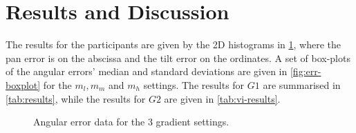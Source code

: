 \documentclass{llncs}
\begin{document}
\section{Results and Discussion}\label{sec:results}

The results for the participants are given by the 2D histograms in \cref{fig:err-results}, where the pan error is on the abscissa and the tilt error on the ordinates.
A set of box-plots of the angular errors' median and standard deviations are given in \cref{fig:err-boxplot} for the $m_l, m_m$ and $m_h$ settings. 
The results for $G1$ are summarised in \cref{tab:results}, while the results for $G2$ are given in \cref{tab:vi-results}.

\begin{figure}
  \centering



  \caption{Angular error data for the 3 gradient settings. }\label{fig:err-results}
\end{figure}
\end{document}
